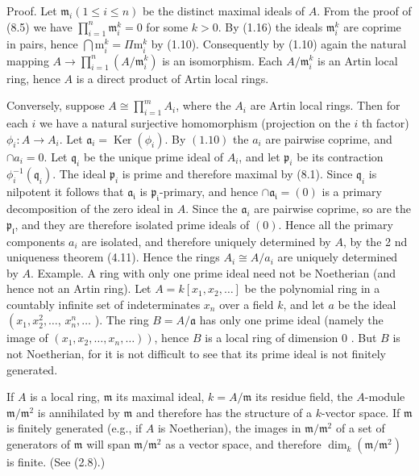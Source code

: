\documentclass{standalone}
\theoremstyle{definition}
\theoremstyle{remark}
\begin{document}
Proof. Let $\mathfrak{m}_{i}(1 \leqslant i \leqslant n)$ be the distinct maximal ideals of $A$. From the proof of (8.5) we have $\prod_{i=1}^{n} \mathfrak{m}_{i}^{k}=0$ for some $k>0$. By (1.16) the ideals $\mathfrak{m}_{i}^{k}$ are coprime in pairs, hence $\bigcap \mathrm{m}_{i}^{k}=\Pi \mathrm{m}_{i}^{k}$ by (1.10). Consequently by (1.10) again the natural mapping $A \rightarrow \prod_{i=1}^{n}\left(A / \mathfrak{m}_{i}^{k}\right)$ is an isomorphism. Each $A / \mathfrak{m}_{i}^{k}$ is an Artin local ring, hence $A$ is a direct product of Artin local rings.

Conversely, suppose $A \cong \prod_{i=1}^{m} A_{i}$, where the $A_{i}$ are Artin local rings. Then for each $i$ we have a natural surjective homomorphism (projection on the $i$ th factor) $\phi_{i}: A \rightarrow A_{i}$. Let $\mathfrak{a}_{i}=\operatorname{Ker}\left(\phi_{i}\right)$. By $(1.10)$ the $a_{i}$ are pairwise coprime, and $\cap a_{i}=0$. Let $\mathfrak{q}_{i}$ be the unique prime ideal of $A_{i}$, and let $\mathfrak{p}_{i}$ be its contraction $\phi_{i}^{-1}\left(\mathfrak{q}_{i}\right)$. The ideal $\mathfrak{p}_{i}$ is prime and therefore maximal by (8.1). Since $\mathfrak{q}_{i}$ is nilpotent it follows that $\mathfrak{a}_{\mathfrak{i}}$ is $\mathfrak{p}_{\mathfrak{i}}$-primary, and hence $\cap \mathfrak{a}_{\mathfrak{i}}=(0)$ is a primary decomposition of the zero ideal in $A$. Since the $\mathfrak{a}_{i}$ are pairwise coprime, so are the $\mathfrak{p}_{\mathfrak{l}}$, and they are therefore isolated prime ideals of $(0)$. Hence all the primary components $a_{i}$ are isolated, and therefore uniquely determined by $A$, by the 2 nd uniqueness theorem (4.11). Hence the rings $A_{i} \cong A / a_{i}$ are uniquely determined by $A$. Example. A ring with only one prime ideal need not be Noetherian (and hence not an Artin ring). Let $A=k\left[x_{1}, x_{2}, \ldots\right]$ be the polynomial ring in a countably infinite set of indeterminates $x_{n}$ over a field $k$, and let $a$ be the ideal $\left(x_{1}, x_{2}^{2}, \ldots\right.$, $x_{n}^{n}, \ldots$ ). The ring $B=A / \mathfrak{a}$ has only one prime ideal (namely the image of $\left.\left(x_{1}, x_{2}, \ldots, x_{n}, \ldots\right)\right)$, hence $B$ is a local ring of dimension 0 . But $B$ is not Noetherian, for it is not difficult to see that its prime ideal is not finitely generated.

If $A$ is a local ring, $\mathfrak{m}$ its maximal ideal, $k=A / \mathfrak{m}$ its residue field, the $A$-module $\mathfrak{m} / \mathfrak{m}^{2}$ is annihilated by $\mathfrak{m}$ and therefore has the structure of a $k$-vector space. If $\mathfrak{m}$ is finitely generated (e.g., if $A$ is Noetherian), the images in $\mathfrak{m} / \mathfrak{m}^{2}$ of a set of generators of $\mathfrak{m}$ will span $\mathfrak{m} / \mathfrak{m}^{2}$ as a vector space, and therefore $\operatorname{dim}_{k}\left(\mathfrak{m} / \mathfrak{m}^{2}\right)$ is finite. (See (2.8).)
\end{document}
